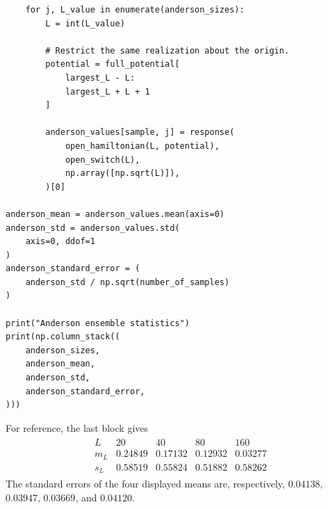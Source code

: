 \documentclass[a4paper,10pt]{article}
\numberwithin{equation}{section}
\theoremstyle{plain}
\theoremstyle{plain}
\theoremstyle{plain}
\theoremstyle{plain}
\theoremstyle{plain}
\theoremstyle{remark}
\theoremstyle{definition}
\theoremstyle{plain}
\newcommand{\eq}[1]{\begin{align*}#1\end{align*}}
\begin{document}
\begin{verbatim}
    for j, L_value in enumerate(anderson_sizes):
        L = int(L_value)

        # Restrict the same realization about the origin.
        potential = full_potential[
            largest_L - L:
            largest_L + L + 1
        ]

        anderson_values[sample, j] = response(
            open_hamiltonian(L, potential),
            open_switch(L),
            np.array([np.sqrt(L)]),
        )[0]

anderson_mean = anderson_values.mean(axis=0)
anderson_std = anderson_values.std(
    axis=0, ddof=1
)
anderson_standard_error = (
    anderson_std / np.sqrt(number_of_samples)
)

print("Anderson ensemble statistics")
print(np.column_stack((
    anderson_sizes,
    anderson_mean,
    anderson_std,
    anderson_standard_error,
)))
\end{verbatim}

For reference, the last block gives
\eq{
\begin{array}{c|cccc}
L & 20 & 40 & 80 & 160\\ \hline
m_L
&0.24849&0.17132&0.12932&0.03277\\
s_L
&0.58519&0.55824&0.51882&0.58262
\end{array}}
The standard errors of the four displayed means are, respectively,
$0.04138$, $0.03947$, $0.03669$, and $0.04120$.
  
  \begingroup
		\let\itshape\upshape
		\printbibliography
		\endgroup
	
    
    
    
\end{document}
